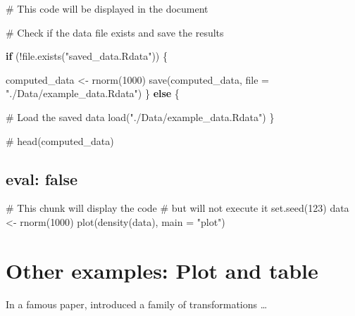 \documentclass[
  journal,
]{IEEEtran}%
\newenvironment{Shaded}{\begin{snugshade}}{\end{snugshade}}
\newcommand{\AttributeTok}[1]{\textcolor[rgb]{0.40,0.45,0.13}{#1}}
\newcommand{\CommentTok}[1]{\textcolor[rgb]{0.37,0.37,0.37}{#1}}
\newcommand{\ControlFlowTok}[1]{\textcolor[rgb]{0.00,0.23,0.31}{\textbf{#1}}}
\newcommand{\DecValTok}[1]{\textcolor[rgb]{0.68,0.00,0.00}{#1}}
\newcommand{\FunctionTok}[1]{\textcolor[rgb]{0.28,0.35,0.67}{#1}}
\newcommand{\NormalTok}[1]{\textcolor[rgb]{0.00,0.23,0.31}{#1}}
\newcommand{\OtherTok}[1]{\textcolor[rgb]{0.00,0.23,0.31}{#1}}
\newcommand{\SpecialCharTok}[1]{\textcolor[rgb]{0.37,0.37,0.37}{#1}}
\newcommand{\StringTok}[1]{\textcolor[rgb]{0.13,0.47,0.30}{#1}}
\begin{document}
\begin{Shaded}
\begin{Highlighting}[]
\CommentTok{\# This code will be displayed in the document}

\CommentTok{\# Check if the data file exists and save the results}

\ControlFlowTok{if}\NormalTok{ (}\SpecialCharTok{!}\FunctionTok{file.exists}\NormalTok{(}\StringTok{"saved\_data.Rdata"}\NormalTok{)) \{}

\NormalTok{  computed\_data }\OtherTok{\textless{}{-}} \FunctionTok{rnorm}\NormalTok{(}\DecValTok{1000}\NormalTok{)}
  \FunctionTok{save}\NormalTok{(computed\_data, }\AttributeTok{file =} \StringTok{"./Data/example\_data.Rdata"}\NormalTok{)}
\NormalTok{\} }\ControlFlowTok{else}\NormalTok{ \{}
  
  \CommentTok{\# Load the saved data}
  \FunctionTok{load}\NormalTok{(}\StringTok{"./Data/example\_data.Rdata"}\NormalTok{)}
\NormalTok{\}}

\CommentTok{\# }
\FunctionTok{head}\NormalTok{(computed\_data)}
\end{Highlighting}
\end{Shaded}

\subsection{eval: false}\label{eval-false}

\begin{Shaded}
\begin{Highlighting}[]
\CommentTok{\# This chunk will display the code}
\CommentTok{\# but will not execute it}
\FunctionTok{set.seed}\NormalTok{(}\DecValTok{123}\NormalTok{)}
\NormalTok{data }\OtherTok{\textless{}{-}} \FunctionTok{rnorm}\NormalTok{(}\DecValTok{1000}\NormalTok{)}
\FunctionTok{plot}\NormalTok{(}\FunctionTok{density}\NormalTok{(data), }\AttributeTok{main =} \StringTok{"plot"}\NormalTok{)}
\end{Highlighting}
\end{Shaded}

\section{Other examples: Plot and
table}\label{other-examples-plot-and-table}

In a famous paper,  introduced a family of
transformations \dots
\end{document}
